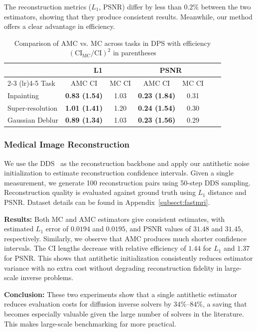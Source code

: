 \documentclass[12pt]{article}
\newcommand{\0}{\mathbf{0}}
\begin{document}
The reconstruction metrics ($L_1$, PSNR) differ by less than $0.2\%$ between the two estimators, showing that they produce consistent results. Meanwhile, our method offers a clear advantage in efficiency.

\begin{table}[ht]
\centering
\caption{Comparison of AMC vs. MC across tasks in DPS with efficiency $(\text{CI}_{\text{MC}} / \text{CI})^2$ in parentheses}
\label{tab:DPS_combined_results}
\begin{tabular}{lcccccc}
\toprule
& \multicolumn{2}{c}{\textbf{L1}} & \multicolumn{2}{c}{\textbf{PSNR}} \\
\cmidrule(lr){2-3} \cmidrule(lr){4-5}
Task & AMC CI & MC CI & AMC CI & MC CI \\
\midrule
Inpainting & \textbf{0.83 (1.54)} & 1.03 & \textbf{0.23 (1.84)} & 0.31 \\
Super-resolution & \textbf{1.01 (1.41)} & 1.20 & \textbf{0.24 (1.54)} & 0.30 \\
Gaussian Deblur & \textbf{0.89 (1.34)} & 1.03 & \textbf{0.23 (1.56)} & 0.29 \\
\bottomrule
\end{tabular}
\end{table}

\subsubsection{Medical Image Reconstruction}

 
We use the DDS~\citep{chung2023decomposed} as the reconstruction backbone and apply our antithetic noise initialization to estimate reconstruction confidence intervals. Given a single measurement, we generate 100 reconstruction pairs using 50-step DDS sampling. Reconstruction quality is evaluated against ground truth using $L_1$ distance and PSNR. Dataset details can be found in Appendix~\ref{subsect:fastmri}.

\textbf{Results:} 
Both MC and AMC estimators give consistent estimates, with estimated $L_1$ error of $0.0194$ and $0.0195$, and PSNR values of $31.48$ and $31.45$, respectively. Similarly, we observe that AMC produces much shorter confidence intervals. The CI lengths decrease with relative efficiency of $1.44$ for $L_1$ and $1.37$ for PSNR. This  shows that antithetic initialization consistently reduces estimator variance  with no extra cost without degrading reconstruction fidelity in large-scale inverse problems.

\textbf{Conclusion:} These two experiments show that a single antithetic estimator reduces evaluation costs for diffusion inverse solvers by $34\%$–$84\%$, a saving that becomes especially valuable given the large number of solvers in the literature. This makes large-scale benchmarking far more practical.
\end{document}
